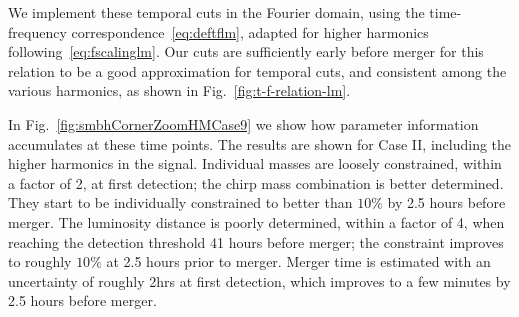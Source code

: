 \documentclass[aps,showpacs,twocolumn,prd,superscriptaddress,nofootinbib]{revtex4-1}
\begin{document}

We implement these temporal cuts in the Fourier domain, using the time-frequency correspondence~\eqref{eq:deftflm}, adapted for higher harmonics following~\eqref{eq:fscalinglm}. Our cuts are sufficiently early before merger for this relation to be a good approximation for temporal cuts, and consistent among the various harmonics, as shown in Fig.~\ref{fig:t-f-relation-lm}.

In Fig.~\ref{fig:smbhCornerZoomHMCase9} we show how parameter information accumulates at these time points. The results are shown for Case II, including the higher harmonics in the signal. Individual masses are loosely constrained, within a factor of 2, at first detection; the chirp mass combination is better determined. They start to be individually constrained to better than $10\%$ by 2.5 hours before merger. The luminosity distance is poorly determined, within a factor of 4, when reaching the detection threshold 41 hours before merger; the constraint improves to roughly $10\%$ at 2.5 hours prior to merger. Merger time is estimated with an uncertainty of roughly 2hrs at first detection, which improves to a few minutes by 2.5 hours before merger.
\end{document}
